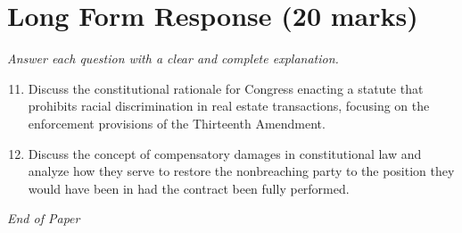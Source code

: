 \documentclass[12pt]{article}
\begin{document}
\section*{Long Form Response (20 marks)}
\textit{Answer each question with a clear and complete explanation.}
\begin{enumerate}[label=\arabic*.]
\setcounter{enumi}{10}
\item Discuss the constitutional rationale for Congress enacting a statute that prohibits racial discrimination in real estate transactions, focusing on the enforcement provisions of the Thirteenth Amendment.
\item Discuss the concept of compensatory damages in constitutional law and analyze how they serve to restore the nonbreaching party to the position they would have been in had the contract been fully performed.
\end{enumerate}

\vfill
\noindent\textit{End of Paper}
\end{document}
